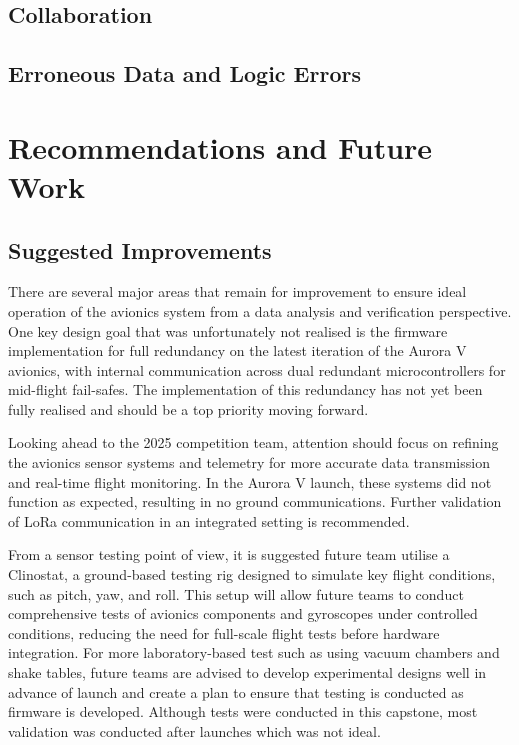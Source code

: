 \subsection{Collaboration}
\subsection{Erroneous Data and Logic Errors}

\section{Recommendations and Future Work}
\subsection{Suggested Improvements}
There are several major areas that remain for improvement to ensure ideal operation of the avionics system from a data analysis and verification perspective. One key design goal that was unfortunately not realised is the firmware implementation for full redundancy on the latest iteration of the Aurora V avionics, with internal communication across dual redundant microcontrollers for mid-flight fail-safes. The implementation of this redundancy has not yet been fully realised and should be a top priority moving forward.  

Looking ahead to the 2025 competition team, attention should focus on refining the avionics sensor systems and telemetry for more accurate data transmission and real-time flight monitoring. In the Aurora V launch, these systems did not function as expected, resulting in no ground communications. Further validation of LoRa communication in an integrated setting is recommended.  

From a sensor testing point of view, it is suggested future team utilise a Clinostat, a ground-based testing rig designed to simulate key flight conditions, such as pitch, yaw, and roll. This setup will allow future teams to conduct comprehensive tests of avionics components and gyroscopes under controlled conditions, reducing the need for full-scale flight tests before hardware integration. For more laboratory-based test such as using vacuum chambers and shake tables, future teams are advised to develop experimental designs well in advance of launch and create a plan to ensure that testing is conducted as firmware is developed. Although tests were conducted in this capstone, most validation was conducted after launches which was not ideal.  

